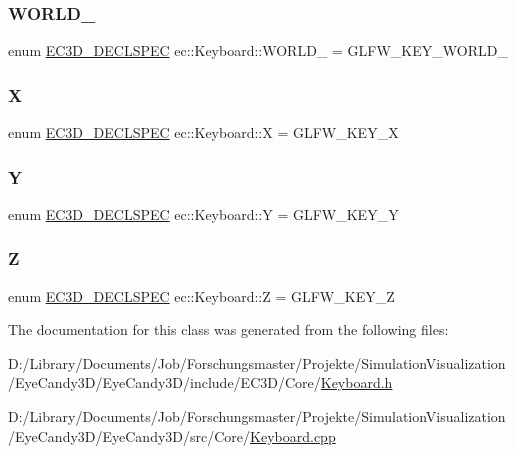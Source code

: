 \subsubsection{\texorpdfstring{W\+O\+R\+L\+D\+\_}{WORLD\_2}}
{\footnotesize\ttfamily enum \mbox{\hyperlink{_common_8h_aac42573e202ca3dd4d259c81691e2369}{E\+C3\+D\+\_\+\+D\+E\+C\+L\+S\+P\+EC}} ec\+::\+Keyboard\+::\+W\+O\+R\+L\+D\+\_ = G\+L\+F\+W\+\_\+\+K\+E\+Y\+\_\+\+W\+O\+R\+L\+D\+\_}

\mbox{\label{classec_1_1_keyboard_a46a9272c629195e29395f7e8d22e7cf5}} 
\subsubsection{\texorpdfstring{X}{X}}
{\footnotesize\ttfamily enum \mbox{\hyperlink{_common_8h_aac42573e202ca3dd4d259c81691e2369}{E\+C3\+D\+\_\+\+D\+E\+C\+L\+S\+P\+EC}} ec\+::\+Keyboard\+::X = G\+L\+F\+W\+\_\+\+K\+E\+Y\+\_\+X}

\mbox{\label{classec_1_1_keyboard_a3e6065997f9693286591e1300769e13a}} 
\subsubsection{\texorpdfstring{Y}{Y}}
{\footnotesize\ttfamily enum \mbox{\hyperlink{_common_8h_aac42573e202ca3dd4d259c81691e2369}{E\+C3\+D\+\_\+\+D\+E\+C\+L\+S\+P\+EC}} ec\+::\+Keyboard\+::Y = G\+L\+F\+W\+\_\+\+K\+E\+Y\+\_\+Y}

\mbox{\label{classec_1_1_keyboard_a342c1ef739e9fd209135017e48f25c58}} 
\subsubsection{\texorpdfstring{Z}{Z}}
{\footnotesize\ttfamily enum \mbox{\hyperlink{_common_8h_aac42573e202ca3dd4d259c81691e2369}{E\+C3\+D\+\_\+\+D\+E\+C\+L\+S\+P\+EC}} ec\+::\+Keyboard\+::Z = G\+L\+F\+W\+\_\+\+K\+E\+Y\+\_\+Z}



The documentation for this class was generated from the following files\+:\begin{DoxyCompactItemize}
\item 
D\+:/\+Library/\+Documents/\+Job/\+Forschungsmaster/\+Projekte/\+Simulation\+Visualization/\+Eye\+Candy3\+D/\+Eye\+Candy3\+D/include/\+E\+C3\+D/\+Core/\mbox{\hyperlink{_keyboard_8h}{Keyboard.\+h}}\item 
D\+:/\+Library/\+Documents/\+Job/\+Forschungsmaster/\+Projekte/\+Simulation\+Visualization/\+Eye\+Candy3\+D/\+Eye\+Candy3\+D/src/\+Core/\mbox{\hyperlink{_keyboard_8cpp}{Keyboard.\+cpp}}\end{DoxyCompactItemize}
